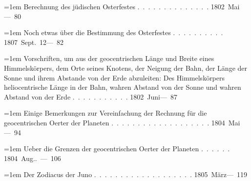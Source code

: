 \noindent\hangindent=1em Berechnung des jüdischen Osterfestes \mbox{.\ .\ .\ .\ .\ .\ .\ .\ .\ .\ .\ .\ .\ .} \hfill\mbox{1802 Mai}\quad\mbox{--- 80}\par\smallskip
\noindent\hangindent=1em Noch etwas über die Bestimmung des Osterfestes \mbox{.\ .\ .\ .\ .\ .\ .\ .\ .\ .} \hfill\mbox{1807 Sept. 12}\quad\mbox{--- 82}\par\smallskip
\noindent\hangindent=1em Vorschriften, um aus der geocentrischen Länge und Breite eines Himmelskörpers, dem Orte seines Knotens, der Neigung der Bahn, der Länge der Sonne und ihrem Abstande von der Erde abzuleiten: Des Himmelskörpers heliocentrische Länge in der Bahn, wahren Abstand von der Sonne und wahren Abstand von der Erde \mbox{.\ .\ .\ .\ .\ .\ .\ .\ .\ .\ .} \hfill\mbox{1802 Juni}\quad\mbox{--- 87}\par\smallskip
\noindent\hangindent=1em Einige Bemerkungen zur Vereinfachung der Rechnung für die geocentrischen Oerter der Planeten \mbox{.\ .\ .\ .\ .\ .\ .\ .\ .\ .\ .\ .\ .\ .\ .\ .\ .\ .\ .} \hfill\mbox{1804 Mai}\quad\mbox{--- 94}\par\smallskip
\noindent\hangindent=1em Ueber die Grenzen der geocentrischen Oerter der Planeten \mbox{.\ .\ .\ .\ .\ .} \hfill\mbox{1804 Aug.}\quad\mbox{. --- 106}\par\smallskip
\noindent\hangindent=1em Der Zodiacus der Juno \mbox{.\ .\ .\ .\ .\ .\ .\ .\ .\ .\ .\ .\ .\ .\ .\ .\ .\ .\ .} \hfill\mbox{1805 März}\quad\mbox{--- 119}\par\smallskip
\endgroup
